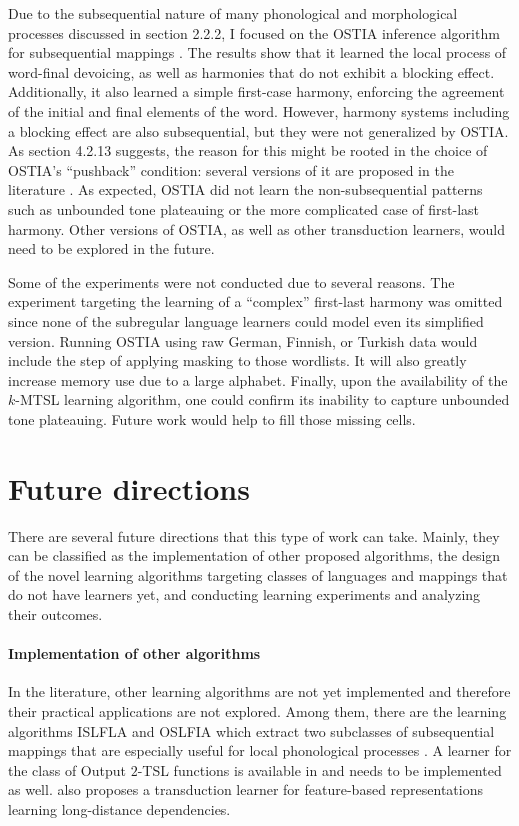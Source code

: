 Due to the subsequential nature of many phonological and morphological processes discussed in section 2.2.2, I focused on the OSTIA inference algorithm for subsequential mappings \citep{OncinaEtAl1993,DeLaHiguera2010}.
The results show that it learned the local process of word-final devoicing, as well as harmonies that do not exhibit a blocking effect.
Additionally, it also learned a simple first-case harmony, enforcing the agreement of the initial and final elements of the word.
However, harmony systems including a blocking effect are also subsequential, but they were not generalized by OSTIA.
As section 4.2.13 suggests, the reason for this might be rooted in the choice of OSTIA's ``pushback'' condition: several versions of it are proposed in the literature \citep{OncinaEtAl1993,DeLaHiguera2010,DeLaHiguera2011}.
As expected, OSTIA did not learn the non-subsequential patterns such as unbounded tone plateauing or the more complicated case of first-last harmony.
Other versions of OSTIA, as well as other transduction learners, would need to be explored in the future.



Some of the experiments were not conducted due to several reasons.
The experiment targeting the learning of a ``complex'' first-last harmony was omitted since none of the subregular language learners could model even its simplified version.
Running OSTIA using raw German, Finnish, or Turkish data would include the step of applying masking to those wordlists.
It will also greatly increase memory use due to a large alphabet.
Finally, upon the availability of the $k$-MTSL learning algorithm, one could confirm its inability to capture unbounded tone plateauing.
Future work would help to fill those missing cells.






\section{Future directions}


There are several future directions that this type of work can take.
Mainly, they can be classified as the implementation of other proposed algorithms, the design of the novel learning algorithms targeting classes of languages and mappings that do not have learners yet, and conducting learning experiments and analyzing their outcomes.

\paragraph{Implementation of other algorithms}
In the literature, other learning algorithms are not yet implemented and therefore their practical applications are not explored.
Among them, there are the learning algorithms ISLFLA and OSLFIA which extract two subclasses of subsequential mappings that are especially useful for local phonological processes \citep{ChandleeEtAl2014,ChandleeEtAl2015}.
A learner for the class of Output $2$-TSL functions is available in \citep{BurnessMcMullin2019} and needs to be implemented as well.
\cite{chandlee-etal-2019-learning} also proposes a transduction learner for feature-based representations learning long-distance dependencies.

